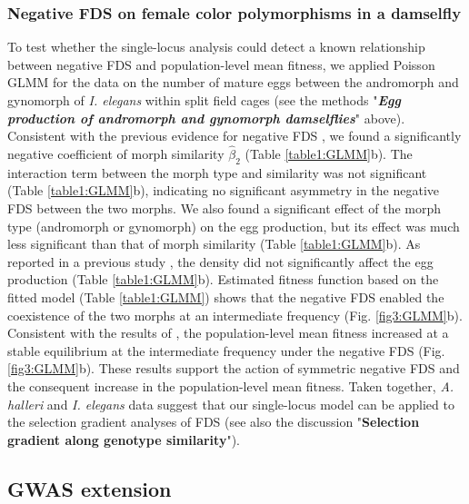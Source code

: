 \documentclass[12pt,]{article}
\begin{document}
\subsubsection{Negative FDS on female color polymorphisms in a damselfly}
To test whether the single-locus analysis could detect a known relationship between negative FDS and population-level mean fitness, we applied Poisson GLMM for the data on the number of mature eggs between the andromorph and gynomorph of \textit{I. elegans} within split field cages (see the methods "\textit{\textbf{Egg production of andromorph and gynomorph damselflies}}" above). Consistent with the previous evidence for negative FDS \citep{van2001frequency, le2015evolutionary}, we found a significantly negative coefficient of morph similarity $\hat{\beta}_2$ (Table \ref{table1:GLMM}b). The interaction term between the morph type and similarity was not significant (Table \ref{table1:GLMM}b), indicating no significant asymmetry in the negative FDS between the two morphs. We also found a significant effect of the morph type (andromorph or gynomorph) on the egg production, but its effect was much less significant than that of morph similarity (Table \ref{table1:GLMM}b). As reported in a previous study \citep{takahashi2014evolution}, the density did not significantly affect the egg production (Table \ref{table1:GLMM}b). Estimated fitness function based on the fitted model (Table \ref{table1:GLMM}) shows that the negative FDS enabled the coexistence of the two morphs at an intermediate frequency (Fig. \ref{fig3:GLMM}b). Consistent with the results of \cite{takahashi2014evolution}, the population-level mean fitness increased at a stable equilibrium at the intermediate frequency under the negative FDS (Fig. \ref{fig3:GLMM}b). These results support the action of symmetric negative FDS and the consequent increase in the population-level mean fitness. Taken together, \textit{A. halleri} and \textit{I. elegans} data suggest that our single-locus model can be applied to the selection gradient analyses of FDS (see also the discussion "\textbf{Selection gradient along genotype similarity}").

\subsection{GWAS extension}
\end{document}
